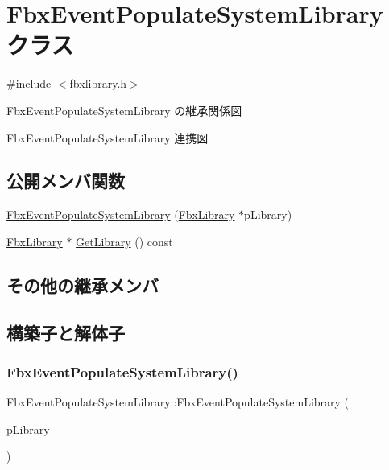 \hypertarget{class_fbx_event_populate_system_library}{}\section{Fbx\+Event\+Populate\+System\+Library クラス}
\label{class_fbx_event_populate_system_library}


{\ttfamily \#include $<$fbxlibrary.\+h$>$}



Fbx\+Event\+Populate\+System\+Library の継承関係図


Fbx\+Event\+Populate\+System\+Library 連携図
\subsection*{公開メンバ関数}
\begin{DoxyCompactItemize}
\item 
\hyperlink{class_fbx_event_populate_system_library_a0fc24725b0cdb572a82e40825b37156b}{Fbx\+Event\+Populate\+System\+Library} (\hyperlink{class_fbx_library}{Fbx\+Library} $\ast$p\+Library)
\item 
\hyperlink{class_fbx_library}{Fbx\+Library} $\ast$ \hyperlink{class_fbx_event_populate_system_library_a9916adf51d1fed8a4c6aeb8f12587ce0}{Get\+Library} () const
\end{DoxyCompactItemize}
\subsection*{その他の継承メンバ}


\subsection{構築子と解体子}
\mbox{\label{class_fbx_event_populate_system_library_a0fc24725b0cdb572a82e40825b37156b}} 
\subsubsection{\texorpdfstring{Fbx\+Event\+Populate\+System\+Library()}{FbxEventPopulateSystemLibrary()}}
{\footnotesize\ttfamily Fbx\+Event\+Populate\+System\+Library\+::\+Fbx\+Event\+Populate\+System\+Library (\begin{DoxyParamCaption}\item[{\hyperlink{class_fbx_library}{Fbx\+Library} $\ast$}]{p\+Library }\end{DoxyParamCaption})}



